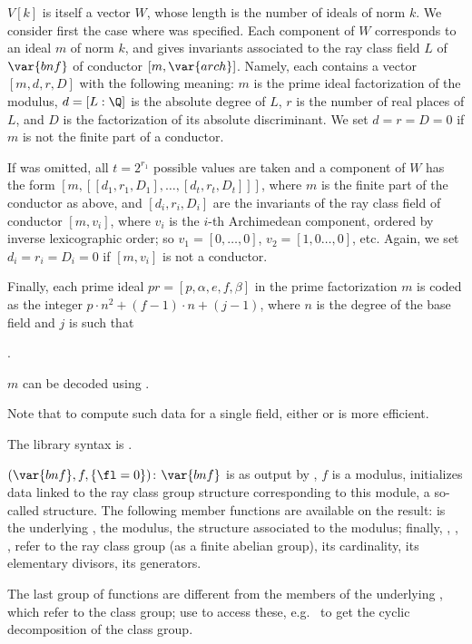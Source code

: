 $V[k]$ is itself a vector $W$, whose length is the number of ideals of norm
$k$. We consider first the case where  was specified. Each
component of $W$ corresponds to an ideal $m$ of norm $k$, and
gives invariants associated to the ray class field $L$ of $\var{bnf}$ of
conductor $[m, \var{arch}]$. Namely, each contains a vector $[m,d,r,D]$ with
the following meaning: $m$ is the prime ideal factorization of the modulus,
$d = [L:\Q]$ is the absolute degree of $L$, $r$ is the number of real places
of $L$, and $D$ is the factorization of its absolute discriminant. We set $d
= r = D = 0$ if $m$ is not the finite part of a conductor.

If  was omitted, all $t = 2^{r_1}$ possible values are taken and a
component of $W$ has the form $[m, [[d_1,r_1,D_1], \dots, [d_t,r_t,D_t]]]$,
where $m$ is the finite part of the conductor as above, and
$[d_i,r_i,D_i]$ are the invariants of the ray class field of conductor
$[m,v_i]$, where $v_i$ is the $i$-th Archimedean component, ordered by
inverse lexicographic order; so $v_1 = [0,\dots,0]$, $v_2 = [1,0\dots,0]$,
etc. Again, we set $d_i = r_i = D_i = 0$ if $[m,v_i]$ is not a conductor.

Finally, each prime ideal $pr = [p,\alpha,e,f,\beta]$ in the prime
factorization $m$ is coded as the integer $p\cdot n^2+(f-1)\cdot n+(j-1)$,
where $n$ is the degree of the base field and $j$ is such that

.

\noindent $m$ can be decoded using .

Note that to compute such data for a single field, either 
or  is more efficient.

The library syntax is .

$(\var{bnf},f,\{\fl=0\})$: \label{se:bnrinit}$\var{bnf}$ is as
output by , $f$ is a modulus, initializes data linked to
the ray class group structure corresponding to this module, a so-called
 structure. The following member functions are available
on the result:  is the underlying ,
 the modulus,  the  structure associated to the
modulus; finally, , , ,  refer to the
ray class group (as a finite abelian group), its cardinality, its elementary
divisors, its generators.

The last group of functions are different from the members of the underlying
, which refer to the class group; use 
to access these, e.g.~ to get the cyclic decomposition
of the class group.

